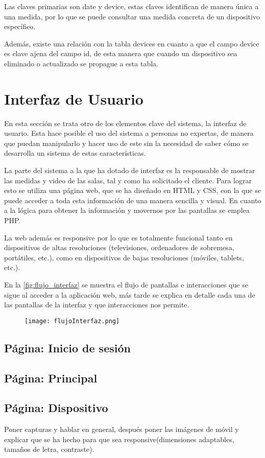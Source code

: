 Las claves primarias son date y device, estas claves identifican de manera única a una medida, por lo que se puede consultar una medida concreta de un dispositivo específico.

Además, existe una relación con la tabla devices en cuanto a que el campo device es clave ajena del campo id, de esta manera que cuando un dispositivo sea eliminado o actualizado se propague a esta tabla.

\section{Interfaz de Usuario}\label{sec:interfaz}
En esta sección se trata otro de los elementos clave del sistema, la interfaz de usuario. Esta hace posible el uso del sistema a personas no expertas, de manera que puedan manipularlo y hacer uso de este sin la necesidad de saber cómo se desarrolla un sistema de estas características.

La parte del sistema a la que ha dotado de interfaz es la responsable de mostrar las medidas y video de las salas, tal y como ha solicitado el cliente. Para lograr esto se utiliza una página web, que se ha diseñado en HTML y CSS, con la que se puede acceder a toda esta información de una manera sencilla y visual. En cuanto a la lógica para obtener la información y movernos por las pantallas se emplea PHP.

La web además es responsive por lo que es totalmente funcional tanto en dispositivos de altas resoluciones (televisiones, ordenadores de sobremesa, portátiles, etc.), como en dispositivos de bajas resoluciones (móviles, tablets, etc.).

En la \autoref{fig:flujo_interfaz} se muestra el flujo de pantallas e interacciones que se sigue al acceder a la aplicación web, más tarde se explica en detalle cada una de las pantallas de la interfaz y que interacciones nos permite.
\begin{figure}[H]
	{\texttt{[image: flujoInterfaz.png]}}
\end{figure}

\subsection{Página: Inicio de sesión}

\subsection{Página: Principal}

\subsection{Página: Dispositivo}

Poner capturas y hablar en general, después poner las imágenes de móvil y explicar que se ha hecho para que sea responsive(dimensiones adaptables, tamaños de letra, contraste).
